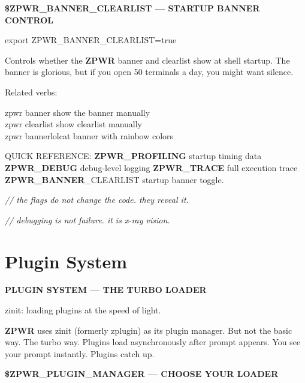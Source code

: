 \documentclass[11pt,a4paper,twoside]{book}
\begin{document}
\vspace{12pt}
{\bfseries\color{neonyellow} \$\textbf{ZPWR\_BANNER}\_CLEARLIST — STARTUP BANNER CONTROL}\vspace{4pt}

\begin{codebox}
\color{neongreen}export ZPWR\_BANNER\_CLEARLIST=true\\
\end{codebox}

Controls whether the \textbf{ZPWR} banner and clearlist show at shell startup. The banner is glorious, but if you open 50 terminals a day, you might want silence.

Related verbs:

\begin{codebox}
\color{neongreen}zpwr banner          show the banner manually\\
\color{neongreen}zpwr clearlist       show clearlist manually\\
\color{neongreen}zpwr bannerlolcat    banner with rainbow colors\\
\end{codebox}

QUICK REFERENCE: \textbf{ZPWR\_PROFILING}        startup timing data \textbf{ZPWR\_DEBUG}            debug-level logging \textbf{ZPWR\_TRACE}            full execution trace \textbf{ZPWR\_BANNER}\_CLEARLIST startup banner toggle.

{\small\itshape\color{dimtext} // the flags do not change the code. they reveal it.}

{\small\itshape\color{dimtext} // debugging is not failure. it is x-ray vision.}


\vspace{16pt}

\section{Plugin System}


\vspace{10pt}
{\large\bfseries\color{neoncyan} PLUGIN SYSTEM — THE TURBO LOADER}\vspace{6pt}

zinit: loading plugins at the speed of light.

\textbf{ZPWR} uses zinit (formerly zplugin) as its plugin manager. But not the basic way. The turbo way. Plugins load asynchronously after prompt appears. You see your prompt instantly. Plugins catch up.


\vspace{12pt}
{\bfseries\color{neonyellow} \$\textbf{ZPWR\_PLUGIN}\_MANAGER — CHOOSE YOUR LOADER}\vspace{4pt}
\end{document}
